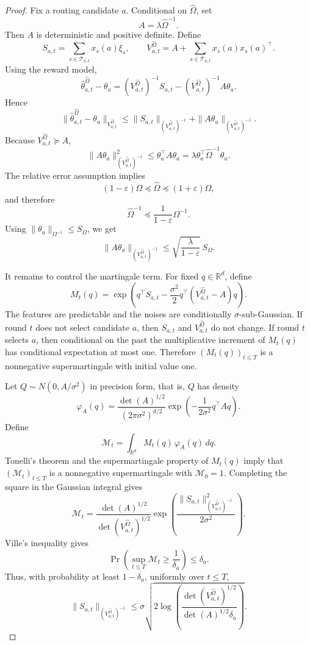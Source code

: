 \documentclass{article} %
\begin{document}
\begin{proof}
Fix a routing candidate \(a\).  Conditional on \(\widehat\Omega\), set
\[
A=\lambda\widehat\Omega^{-1}.
\]
Then \(A\) is deterministic and positive definite.  Define
\[
S_{a,t}=\sum_{s\in\mathcal{T}_{a,t}}x_s(a)\xi_s,
\qquad
V_{a,t}^{\widehat\Omega}
=
A+\sum_{s\in\mathcal{T}_{a,t}}x_s(a)x_s(a)^\top.
\]
Using the reward model,
\[
\widehat\theta_{a,t}^{\widehat\Omega}-\theta_a
=
(V_{a,t}^{\widehat\Omega})^{-1}S_{a,t}
-
(V_{a,t}^{\widehat\Omega})^{-1}A\theta_a.
\]
Hence
\[
\|\widehat\theta_{a,t}^{\widehat\Omega}-\theta_a\|_{V_{a,t}^{\widehat\Omega}}
\le
\|S_{a,t}\|_{(V_{a,t}^{\widehat\Omega})^{-1}}
+
\|A\theta_a\|_{(V_{a,t}^{\widehat\Omega})^{-1}}.
\]
Because \(V_{a,t}^{\widehat\Omega}\succeq A\),
\[
\|A\theta_a\|_{(V_{a,t}^{\widehat\Omega})^{-1}}^2
\le
\theta_a^\top A\theta_a
=
\lambda\theta_a^\top\widehat\Omega^{-1}\theta_a.
\]
The relative error assumption implies
\[
(1-\varepsilon)\Omega\preceq\widehat\Omega\preceq(1+\varepsilon)\Omega,
\]
and therefore
\[
\widehat\Omega^{-1}\preceq\frac{1}{1-\varepsilon}\Omega^{-1}.
\]
Using \(\|\theta_a\|_{\Omega^{-1}}\le S_\Omega\), we get
\[
\|A\theta_a\|_{(V_{a,t}^{\widehat\Omega})^{-1}}
\le
\sqrt{\frac{\lambda}{1-\varepsilon}}\,S_\Omega.
\]

It remains to control the martingale term.  For fixed \(q\in\mathbb{R}^d\),
define
\[
M_t(q)
=
\exp\!\left(
q^\top S_{a,t}
-
\frac{\sigma^2}{2}
q^\top
\left(V_{a,t}^{\widehat\Omega}-A\right)
q
\right).
\]
The features are predictable and the noises are conditionally
\(\sigma\)-sub-Gaussian.  If round \(t\) does not select candidate \(a\), then
\(S_{a,t}\) and \(V_{a,t}^{\widehat\Omega}\) do not change.  If round \(t\)
selects \(a\), then conditional on the past the multiplicative increment of
\(M_t(q)\) has conditional expectation at most one.  Therefore
\((M_t(q))_{t\le T}\) is a nonnegative supermartingale with initial value one.

Let \(Q\sim N(0,A/\sigma^2)\) in precision form, that is, \(Q\) has density
\[
\varphi_A(q)
=
\frac{\det(A)^{1/2}}{(2\pi\sigma^2)^{d/2}}
\exp\!\left(-\frac{1}{2\sigma^2}q^\top A q\right).
\]
Define
\[
\mathcal{M}_t
=
\int_{\mathbb{R}^d} M_t(q)\,\varphi_A(q)\,dq.
\]
Tonelli's theorem and the supermartingale property of \(M_t(q)\) imply that
\((\mathcal{M}_t)_{t\le T}\) is a nonnegative supermartingale with
\(\mathcal{M}_0=1\).  Completing the square in the Gaussian integral gives
\[
\mathcal{M}_t
=
\frac{\det(A)^{1/2}}{\det(V_{a,t}^{\widehat\Omega})^{1/2}}
\exp\!\left(
\frac{\|S_{a,t}\|_{(V_{a,t}^{\widehat\Omega})^{-1}}^2}{2\sigma^2}
\right).
\]
Ville's inequality gives
\[
\Pr\!\left(\sup_{t\le T}\mathcal{M}_t\ge \frac1{\delta_a}\right)
\le
\delta_a.
\]
Thus, with probability at least \(1-\delta_a\), uniformly over \(t\le T\),
\[
\|S_{a,t}\|_{(V_{a,t}^{\widehat\Omega})^{-1}}
\le
\sigma
\sqrt{
2\log\!\left(
\frac{\det(V_{a,t}^{\widehat\Omega})^{1/2}}
{\det(A)^{1/2}\delta_a}
\right)
}.
\]


\end{proof}
\end{document}
